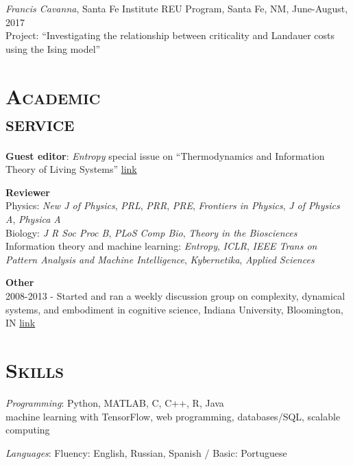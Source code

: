 \documentclass[margin,line,centered]{res}
\begin{document}
\begin{resume}
\emph{Francis Cavanna}, Santa Fe Institute REU Program, Santa Fe, NM, June-August, 2017 \\
Project: ``Investigating the relationship between criticality and Landauer costs using the Ising model''

\section{\textsc{Academic\\service}}

\textbf{Guest editor}: \emph{Entropy} special issue on ``Thermodynamics and Information Theory of Living Systems'' \href{https://www.mdpi.com/journal/entropy/special_issues/thermodynamics_living_systems}{link}

\textbf{Reviewer}\\
Physics: \emph{New J of Physics}, \emph{PRL}, \emph{PRR}, \emph{PRE}, \emph{Frontiers in Physics}, \emph{J of Physics A}, \emph{Physica A}\\
Biology: \emph{J R Soc Proc B}, \emph{PLoS Comp Bio}, \emph{Theory in the Biosciences}\\
Information theory and machine learning: \emph{Entropy}, \emph{ICLR}, \emph{IEEE Trans on Pattern Analysis and Machine Intelligence}, \emph{Kybernetika}, \emph{Applied Sciences}

\textbf{Other}\\
2008-2013 - Started and ran a weekly discussion group on complexity, dynamical systems, and embodiment in cognitive science, Indiana University, Bloomington, IN \href{http://apophenia.wikidot.com/}{link}


\section{\textsc{Skills}}



\hangindent=10pt \emph{Programming}: Python, MATLAB, C, C++, R, Java\\
 machine learning with TensorFlow, web programming, databases/SQL, scalable computing %

\emph{Languages}: Fluency: English, Russian, Spanish / Basic: Portuguese

\end{resume}
\end{document}
